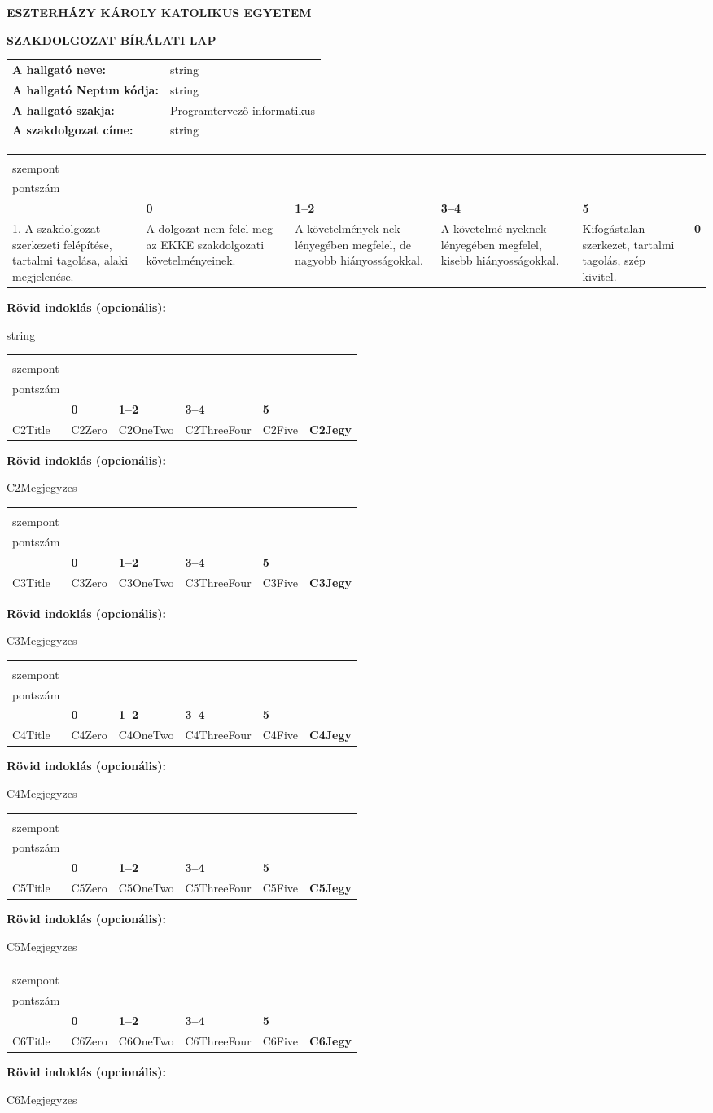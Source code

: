 \documentclass[a4paper,12pt]{article}
\newcommand{\EvaluationTable}[7]{

\renewcommand{\arraystretch}{1.35}

{\fontsize{9pt}{11pt}\selectfont

\begin{tabularx}{\textwidth}{|
>{\raggedright\arraybackslash}p{4.2cm}|
>{\centering\arraybackslash}X|
>{\centering\arraybackslash}X|
>{\centering\arraybackslash}X|
>{\centering\arraybackslash}X|
>{\centering\arraybackslash}p{1.8cm}|}

\hline

\multirow{2}{=}{\centering\textbf{Értékelési\\szempont}}
&
\multicolumn{4}{c|}{\textbf{Adható pontszám}}
&
\multirow{2}{=}{\centering\textbf{Elért\\pontszám}}
\\

\cline{2-5}

&
\textbf{0}
&
\textbf{1--2}
&
\textbf{3--4}
&
\textbf{5}
&
\\

\hline

#1
&
#2
&
#3
&
#4
&
#5
&
\textbf{#6}

\\
\hline

\end{tabularx}

\vspace{3mm}

\textbf{Rövid indoklás (opcionális):}

\vspace{2mm}

#7

\vspace{8mm}

}
}
\begin{document}
\begin{center}

{\Large\textbf{ESZTERHÁZY KÁROLY KATOLIKUS EGYETEM}}

\vspace{0.8cm}

{\LARGE\textbf{SZAKDOLGOZAT BÍRÁLATI LAP}}

\end{center}

\vspace{1cm}

\begin{tabularx}{\textwidth}{>{\bfseries}l X}

A hallgató neve: &
string \\[0.4cm]

A hallgató Neptun kódja: &
string \\[0.4cm]

A hallgató szakja: &
Programtervező informatikus \\[0.4cm]

A szakdolgozat címe: &
string

\end{tabularx}

\vspace{1cm}

\EvaluationTable
{ 1. A szakdolgozat szerkezeti felépítése, tartalmi tagolása, alaki megjelenése. }
{ A dolgozat nem felel meg az EKKE szakdolgozati követelményeinek. }
{ A követelmények-nek lényegében megfelel, de nagyobb hiányosságokkal. }
{ A követelmé-nyeknek lényegében megfelel, kisebb hiányosságokkal. }
{ Kifogástalan szerkezet, tartalmi tagolás, szép kivitel. }
{ 0 }
{ string }

\EvaluationTable
{ {{C2Title}} }
{ {{C2Zero}} }
{ {{C2OneTwo}} }
{ {{C2ThreeFour}} }
{ {{C2Five}} }
{ {{C2Jegy}} }
{ {{C2Megjegyzes}} }

\EvaluationTable
{ {{C3Title}} }
{ {{C3Zero}} }
{ {{C3OneTwo}} }
{ {{C3ThreeFour}} }
{ {{C3Five}} }
{ {{C3Jegy}} }
{ {{C3Megjegyzes}} }

\EvaluationTable
{ {{C4Title}} }
{ {{C4Zero}} }
{ {{C4OneTwo}} }
{ {{C4ThreeFour}} }
{ {{C4Five}} }
{ {{C4Jegy}} }
{ {{C4Megjegyzes}} }

\EvaluationTable
{ {{C5Title}} }
{ {{C5Zero}} }
{ {{C5OneTwo}} }
{ {{C5ThreeFour}} }
{ {{C5Five}} }
{ {{C5Jegy}} }
{ {{C5Megjegyzes}} }

\EvaluationTable
{ {{C6Title}} }
{ {{C6Zero}} }
{ {{C6OneTwo}} }
{ {{C6ThreeFour}} }
{ {{C6Five}} }
{ {{C6Jegy}} }
{ {{C6Megjegyzes}} }
\end{document}
